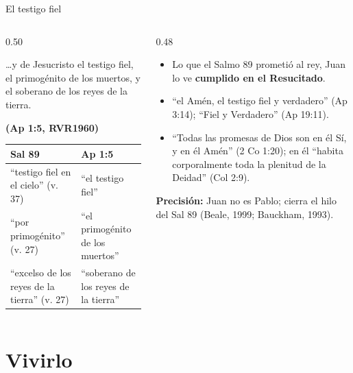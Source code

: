 \documentclass[hyperref={bookmarks=false},aspectratio=169]{beamer}
\newcommand{\fuente}[1]{\par\hfill{\upshape\bfseries\footnotesize\textcolor{azul}{#1}}}
\newcommand{\destacar}[1]{\textbf{\textcolor{azul}{#1}}}
\newcommand{\precision}[1]{{\footnotesize\color{gris}\textbf{Precisión:} #1}}
\begin{document}
\begin{frame}{El testigo fiel}
\begin{columns}[t,onlytextwidth]
\begin{column}{0.50\textwidth}
\begin{cita}\ldots{}y de Jesucristo el testigo fiel, el primogénito de los muertos, y el soberano de los reyes de la tierra.\fuente{(Ap 1:5, RVR1960)}\end{cita}
\scriptsize\renewcommand{\arraystretch}{1.1}
\begin{tabular}{@{}>{\RaggedRight\arraybackslash}p{2.4cm}>{\RaggedRight\arraybackslash}p{3.3cm}@{}}
\toprule
\textbf{Sal 89} & \textbf{Ap 1:5} \\ \midrule
``testigo fiel en el cielo'' (v. 37) & ``el testigo fiel'' \\
``por primogénito'' (v. 27) & ``el primogénito de los muertos'' \\
``excelso de los reyes de la tierra'' (v. 27) & ``soberano de los reyes de la tierra'' \\
\bottomrule
\end{tabular}
\end{column}
\begin{column}{0.48\textwidth}\small
\begin{itemize}
\item Lo que el Salmo 89 prometió al rey, Juan lo ve \destacar{cumplido en el Resucitado}.
\item ``el Amén, el testigo fiel y verdadero'' (Ap 3:14); ``Fiel y Verdadero'' (Ap 19:11).
\item ``Todas las promesas de Dios son en él Sí, y en él Amén'' (2 Co 1:20); en él ``habita corporalmente toda la plenitud de la Deidad'' (Col 2:9).
\end{itemize}
\precision{Juan no es Pablo; cierra el hilo del Sal 89 (Beale, 1999; Bauckham, 1993).}
\end{column}
\end{columns}
\end{frame}

\section{Vivirlo}
\end{document}
